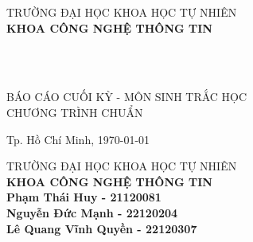 \begin{titlepage}

  \begin{center}
    TRƯỜNG ĐẠI HỌC KHOA HỌC TỰ NHIÊN\\
    \textbf{KHOA CÔNG NGHỆ THÔNG TIN}\\[1.7cm]


    { \Large \bfseries \tenSV\\[1.7cm] }


    { \Large \bfseries \tenKL \\[2cm]}


    \large BÁO CÁO CUỐI KỲ - MÔN SINH TRẮC HỌC\\
    \large CHƯƠNG TRÌNH CHUẨN\\



    \vfill
    Tp. Hồ Chí Minh, \today %

  \end{center}

  \pagebreak



  \begin{center}

    TRƯỜNG ĐẠI HỌC KHOA HỌC TỰ NHIÊN\\
    \textbf{KHOA CÔNG NGHỆ THÔNG TIN}\\[1.7cm]



    {\large \bfseries Phạm Thái Huy - 21120081\\}
    {\large \bfseries Nguyễn Đức Mạnh - 22120204\\}
    {\large \bfseries Lê Quang Vĩnh Quyền - 22120307\\[1.5cm]}



\end{center}
\end{titlepage}
